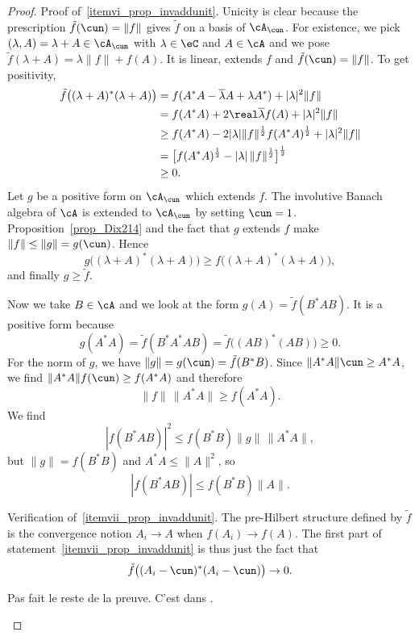 \begin{proof}
	Proof of~\ref{itemvi_prop_invaddunit}. Unicity is clear because the prescription $\tilde f(\cun)=\| f \|$ gives $\tilde f$ on a basis of $\cA_{\cun}$. For existence, we pick $(\lambda,A)=\lambda+A\in\cA_{\cun}$ with $\lambda\in\eC$ and $A\in\cA$ and we pose $\tilde f(\lambda+A)=\lambda\| f \|+f(A)$. It is linear, extends $f$ and $\tilde f(\cun)=\| f \|$. To get positivity,
	\begin{equation}
		\begin{split}
			\tilde f\big( (\lambda+A)^*(\lambda+A) \big)&=f(A^*A-\overline{ \lambda }A+\lambda A^*)+| \lambda |^2\| f \|\\
			&=f(A^*A)+2\real\overline{ \lambda }f(A)+| \lambda |^2\| f \|\\
			&\geq f(A^*A)-2| \lambda |\| f \|^{\frac{ 1 }{2}}f(A^*A)^{\frac{ 1 }{2}}+| \lambda |^2\| f \|\\
			&=\big[ f(A^*A)^{\frac{ 1 }{2}}-| \lambda |\,\| f \|^{\frac{ 1 }{2}} \big]^{\frac{ 1 }{2}}\\&\geq 0.
		\end{split}
	\end{equation}
	Let $g$ be a positive form on $\cA_{\cun}$ which extends $f$. The involutive Banach algebra of $\cA$ is extended to $\cA_{\cun}$ by setting $\cun=1$. Proposition~\ref{prop_Dix214} and the fact that $g$ extends $f$ make $\| f \|\leq\| g \|=g(\cun)$. Hence
	\[
		g\big( (\lambda+A)^*(\lambda+A) \big)\geq f\big( (\lambda+A)^*(\lambda+A) \big),
	\]
	and finally $g\geq\tilde f$.

	Now we take $B\in\cA$ and we look at the form $g(A)=\tilde f(B^*AB)$. It is a positive form because
	\[
		g(A^*A)=\tilde f(B^*A^*AB)=\tilde f\big( (AB)^*(AB) \big)\geq 0.
	\]
	For the norm of $g$, we have $\| g \|=g(\cun)=\tilde f(B^*B)$. Since $\| A^*A \|\cun\geq A^*A$, we find $\| A^*A \|f(\cun)\geq f(A^*A)$ and therefore
	\[
		\| f \|\,\| A^*A \|\geq f(A^*A).
	\]
	We find
	\[
		| f(B^*AB) |^2\leq f(B^*B)\| g \|\,\| A^*A \|,
	\]
	but $\| g \|=f(B^*B)$ and $A^*A\leq\| A \|^2$, so
	\begin{equation}
		| f(B^*AB) |\leq f(B^*B)\| A \|.
	\end{equation}

	Verification of~\ref{itemvii_prop_invaddunit}. The pre-Hilbert structure defined by $\tilde f$ is the convergence notion $A_i\to A$ when $f(A_i)\to f(A)$. The first part of statement~\ref{itemvii_prop_invaddunit} is thus just the fact that
	\[
		\tilde f\big( (A_i-\cun)^*(A_i-\cun) \big)\to 0.
	\]
	\begin{probleme}
		Pas fait le reste de la preuve. C'est dans \cite{Dixmier}.
	\end{probleme}

\end{proof}


